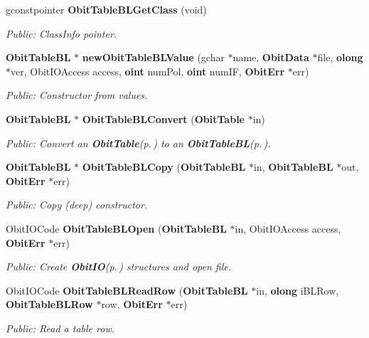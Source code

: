 \begin{CompactItemize}
gconstpointer {\bf Obit\-Table\-BLGet\-Class} (void)
\begin{CompactList}\small\item\em Public: Class\-Info pointer. \item\end{CompactList}\item 
{\bf Obit\-Table\-BL} $\ast$ {\bf new\-Obit\-Table\-BLValue} (gchar $\ast$name, {\bf Obit\-Data} $\ast$file, {\bf olong} $\ast$ver, Obit\-IOAccess access, {\bf oint} num\-Pol, {\bf oint} num\-IF, {\bf Obit\-Err} $\ast$err)
\begin{CompactList}\small\item\em Public: Constructor from values. \item\end{CompactList}\item 
{\bf Obit\-Table\-BL} $\ast$ {\bf Obit\-Table\-BLConvert} ({\bf Obit\-Table} $\ast$in)
\begin{CompactList}\small\item\em Public: Convert an {\bf Obit\-Table}{\rm (p.\,\pageref{structObitTable})} to an {\bf Obit\-Table\-BL}{\rm (p.\,\pageref{structObitTableBL})}. \item\end{CompactList}\item 
{\bf Obit\-Table\-BL} $\ast$ {\bf Obit\-Table\-BLCopy} ({\bf Obit\-Table\-BL} $\ast$in, {\bf Obit\-Table\-BL} $\ast$out, {\bf Obit\-Err} $\ast$err)
\begin{CompactList}\small\item\em Public: Copy (deep) constructor. \item\end{CompactList}\item 
Obit\-IOCode {\bf Obit\-Table\-BLOpen} ({\bf Obit\-Table\-BL} $\ast$in, Obit\-IOAccess access, {\bf Obit\-Err} $\ast$err)
\begin{CompactList}\small\item\em Public: Create {\bf Obit\-IO}{\rm (p.\,\pageref{structObitIO})} structures and open file. \item\end{CompactList}\item 
Obit\-IOCode {\bf Obit\-Table\-BLRead\-Row} ({\bf Obit\-Table\-BL} $\ast$in, {\bf olong} i\-BLRow, {\bf Obit\-Table\-BLRow} $\ast$row, {\bf Obit\-Err} $\ast$err)
\begin{CompactList}\small\item\em Public: Read a table row. \item\end{CompactList}\item 

\end{CompactItemize}
